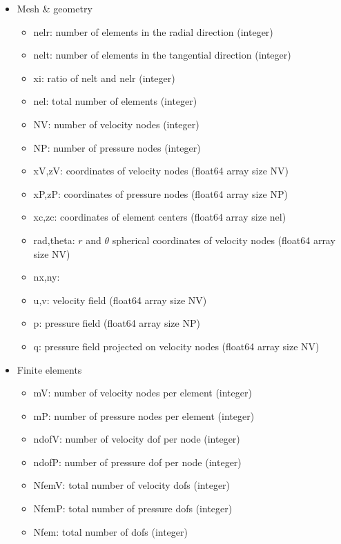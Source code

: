 
\begin{itemize}
\item Mesh \& geometry
\begin{itemize}
\item {\python nelr}: number of elements in the radial direction  (integer)
\item {\python nelt}: number of elements in the tangential direction (integer)
\item {\python xi}: ratio of {\python nelt} and {\python nelr} (integer)
\item {\python nel}: total number of elements (integer)
\item {\python NV}: number of velocity nodes (integer)
\item {\python NP}: number of pressure nodes (integer)
\item {\python xV,zV}: coordinates of velocity nodes (float64 array size {\python NV}) 
\item {\python xP,zP}: coordinates of pressure nodes (float64 array size {\python NP}) 
\item {\python xc,zc}: coordinates of element centers (float64 array size {\python nel}) 
\item {\python rad,theta}: $r$ and $\theta$ spherical coordinates of velocity nodes  (float64 array size {\python NV}) 
\item {\python nx,ny}: 
\item {\python u,v}: velocity field (float64 array size {\python NV})
\item {\python p}: pressure field (float64 array size {\python NP})
\item {\python q}: pressure field projected on velocity nodes (float64 array size {\python NV})
\end{itemize}
\item Finite elements
\begin{itemize}
\item {\python mV}: number of velocity nodes per element (integer)
\item {\python mP}: number of pressure nodes per element (integer)
\item {\python ndofV}: number of velocity dof per node (integer) 
\item {\python ndofP}: number of pressure dof per node (integer) 
\item {\python NfemV}: total number of velocity dofs (integer) 
\item {\python NfemP}: total number of pressure dofs  (integer) 
\item {\python Nfem}: total number of dofs  (integer) 

\end{itemize}
\end{itemize}
